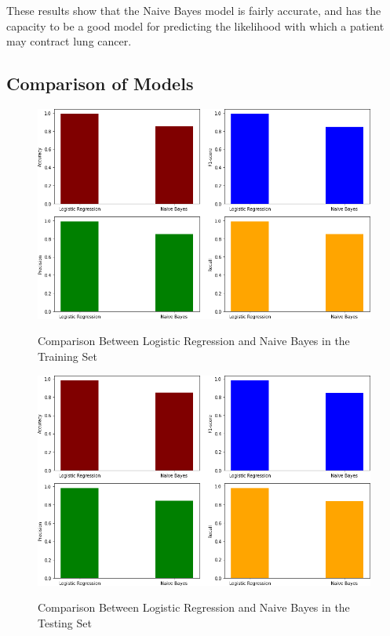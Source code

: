 \documentclass[runningheads]{llncs}
\begin{document}
These results show that the Naive Bayes model is fairly accurate, and has the capacity to be a good model for predicting the likelihood with which a patient may contract lung cancer.

\subsection{Comparison of Models}


\begin{figure}[!htb]           	 
\centering               	 
\caption{Comparison Between Logistic Regression and Naive Bayes in the Training Set} \vspace{0.5em}
\includegraphics[scale=2]{datavis-train.png}  	 
\label{fig:datavis_train}
\end{figure}


\begin{figure}[!htb]           	 
\centering          	 
\caption{Comparison Between Logistic Regression and Naive Bayes in the Testing Set} \vspace{0.5em}
\includegraphics[scale=2]{datavis-test.png}  	 
\label{fig:datavis_test}
\end{figure}
\end{document}
